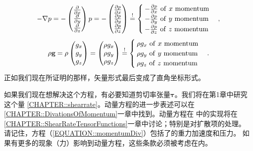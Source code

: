 \documentclass[MathematicsNumericsDerivationsAndOpenFOAM.tex]{subfiles}
\begin{document}
\begin{equation*}
  -  \nabla p
=
  -
  \left(
  \begin{matrix}
   \frac{\partial}{\partial x} \\
   \frac{\partial}{\partial y} \\
   \frac{\partial}{\partial z}
  \end{matrix}
  \right) p
=
-
  \left(
  \begin{matrix}
   \frac{\partial p}{\partial x} \\
   \frac{\partial p}{\partial y} \\
   \frac{\partial p}{\partial z}
  \end{matrix}
  \right)
\overset{!}{=}
  \begin{cases}
  -\frac{\partial p}{\partial x} ~ \mathrm{of~}x ~ \mathrm{momentum} \\
  -\frac{\partial p}{\partial y} ~ \mathrm{of~}y ~ \mathrm{momentum} \\
  -\frac{\partial p}{\partial z} ~ \mathrm{of~}z ~ \mathrm{momentum}
  \end{cases},
\end{equation*}
\begin{equation*}
  \rho \textbf{g}
=
  \rho
  \left(
  \begin{matrix}
    g_x \\
    g_y \\
    g_z
  \end{matrix}
  \right)
=
  \left(
  \begin{matrix}
    \rho g_x \\
    \rho g_y \\
    \rho g_z
  \end{matrix}
  \right)
\overset{!}{=}
  \begin{cases}
  \rho g_x ~ \mathrm{of~}x ~ \mathrm{momentum} \\
  \rho g_y ~ \mathrm{of~}y ~ \mathrm{momentum} \\
  \rho g_z ~ \mathrm{of~}z ~ \mathrm{momentum}
  \end{cases} .
\end{equation*}
%
%
正如我们现在所证明的那样，矢量形式最后变成了直角坐标形式。
	 
如果我们现在想解决这个方程，有必要知道剪切率张量$\boldsymbol \tau$。我们将在第1章中研究这个量 \ref{CHAPTER::shearrate}。动量方程的进一步表述可以在 \ref{CHAPTER::DivationsOfMomentum}一章中找到。动量方程在  \OF 中的实现将在 \ref{CHAPTER::ShearRateTensorFunctions}一章中讨论；特别是对扩散项的处理。 请记住，方程（\ref{EQUATION::momentumDiv}）包括了的重力加速度和压力。 如果有更多的现象（力）影响到动量方程，这些条款必须被考虑在内。
%
%
%
\end{document}
